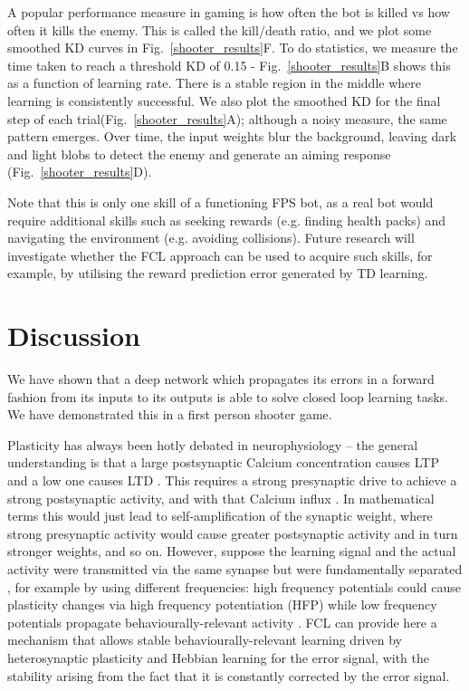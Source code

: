 \documentclass[Afour,sageh,times]{sagej}
\begin{document}
A popular performance measure in gaming is how often the bot is killed
vs how often it kills the enemy. This is called the kill/death ratio,
and we plot some smoothed KD curves in Fig.~\ref{shooter_results}F. To
do statistics, we measure the time taken to reach a threshold KD of
0.15 - Fig.~\ref{shooter_results}B shows this as a function of
learning rate. There is a stable region in the middle where
learning is consistently successful. We also plot the smoothed KD for
the final step of each trial(Fig.~\ref{shooter_results}A); although a
noisy measure, the same pattern emerges. Over time, the input weights
blur the background, leaving dark and light blobs to detect the enemy
and generate an aiming response (Fig.~\ref{shooter_results}D).

Note that this is only one skill of a functioning FPS bot, as a real
bot would require additional skills such as seeking rewards
(e.g. finding health packs) and navigating the environment
(e.g. avoiding collisions). Future research will investigate whether
the FCL approach can be used to acquire such skills, for example,
by utilising the reward prediction error generated by TD learning.


\section{Discussion}
We have shown that a deep network which propagates its errors in a
forward fashion from its inputs to its outputs is able to solve closed
loop learning tasks. We have demonstrated this in a first person
shooter game.

Plasticity has always been hotly debated in neurophysiology -- the
general understanding is that a large postsynaptic Calcium
concentration causes LTP \cite{Malenka99,Bennett2000} and a low one
causes LTD \cite{Mulkey1992}. This requires a strong presynaptic drive
to achieve a strong postsynaptic activity, and with that Calcium
influx \cite{Meunier2017}. In mathematical terms this would just lead
to self-amplification of the synaptic weight, where strong presynaptic
activity would cause greater postsynaptic activity and in turn
stronger weights, and so on. However, suppose the learning signal and
the actual activity were transmitted via the same synapse but were
fundamentally separated \cite{Lindsay2017}, for example by using
different frequencies: high frequency potentials could cause
plasticity changes via high frequency potentiation (HFP) while low
frequency potentials propagate behaviourally-relevant activity
\cite{Canolty2010}. FCL can provide here a mechanism that allows
stable behaviourally-relevant learning driven by heterosynaptic
plasticity and Hebbian learning for the error signal, with the
stability arising from the fact that it is constantly corrected by the
error signal.
\end{document}
